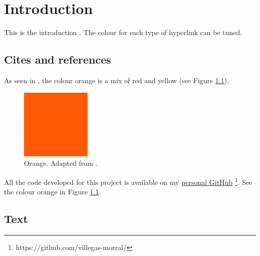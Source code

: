 \chapter{Introduction}

This is the introduction \parencite{vm_2024}. The colour for each type of hyperlink can be tuned.


\section{Cites and references}

As seen in \cite{vm_2024}, the colour orange is a mix of red and yellow (see Figure \ref{fig:orange}). 

\begin{figure}[htbp]      %
    \centering
    \includegraphics[width=0.3\textwidth]{figures/orange.jpeg}
    \caption{Orange. Adapted from \cite{vm_2024}.}
    \label{fig:orange}
\end{figure}

All the code developed for this project is available on my \href{https://github.com/villegas-morral/}{personal GitHub} \footnote{https://github.com/villegas-morral/}. See the colour orange in Figure \ref{fig:orange}.


\section{Text}

\lipsum[3]